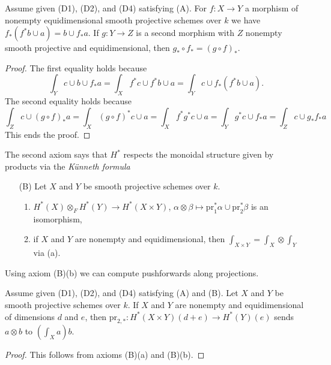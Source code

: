 \begin{lemma}
\label{lemma-pushforward}
Assume given (D1), (D2), and (D4) satisfying (A). For $f : X \to Y$
a morphism of nonempty equidimensional smooth projective schemes over $k$
we have $f_*(f^*b \cup a) = b \cup f_*a$. If $g : Y \to Z$ is a second morphism
with $Z$ nonempty smooth projective and equidimensional, then
$g_* \circ f_* = (g \circ f)_*$.
\end{lemma}

\begin{proof}
The first equality holds because
$$
\int_Y c \cup b \cup f_*a =
\int_X f^*c \cup f^*b \cup a =
\int_Y c \cup f_*(f^*b \cup a).
$$
The second equality holds because
$$
\int_Z c \cup (g \circ f)_*a = \int_X (g \circ f)^*c \cup a =
\int_X f^* g^* c \cup a = \int_Y g^*c \cup f_*a = \int_Z c \cup g_*f_*a
$$
This ends the proof.
\end{proof}

\noindent
The second axiom says that $H^*$ respects the monoidal structure
given by products via the {\it K\"unneth formula}
\begin{enumerate}
\item[(B)] Let $X$ and $Y$ be smooth projective schemes over $k$.
\begin{enumerate}
\item $H^*(X) \otimes_F H^*(Y) \to H^*(X \times Y)$,
$\alpha \otimes \beta \mapsto \text{pr}_1^*\alpha \cup \text{pr}_2^*\beta$
is an isomorphism,
\item if $X$ and $Y$ are nonempty and equidimensional, then
$\int_{X \times Y} = \int_X \otimes \int_Y$ via (a).
\end{enumerate}
\end{enumerate}
Using axiom (B)(b) we can compute pushforwards along projections.

\begin{lemma}
\label{lemma-pr2star}
Assume given (D1), (D2), and (D4) satisfying (A) and (B).
Let $X$ and $Y$ be smooth projective schemes over $k$.
If $X$ and $Y$ are nonempty and equidimensional of dimensions $d$ and $e$, then
$\text{pr}_{2, *} : H^*(X \times Y)(d + e) \to H^*(Y)(e)$ sends
$a \otimes b$ to $(\int_X a) b$.
\end{lemma}

\begin{proof}
This follows from axioms (B)(a) and (B)(b).
\end{proof}

